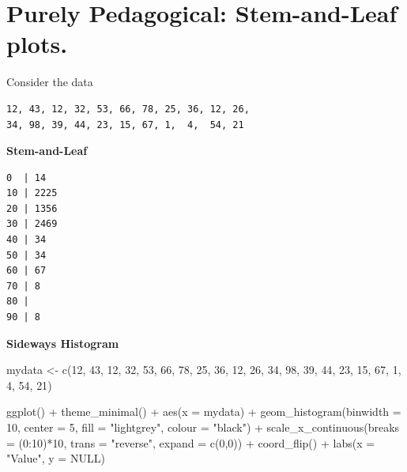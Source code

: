 \documentclass[
  letterpaper,
  DIV=11,
  numbers=noendperiod]{scrreprt}
\newenvironment{Shaded}{\begin{snugshade}}{\end{snugshade}}
\newcommand{\AttributeTok}[1]{\textcolor[rgb]{0.40,0.45,0.13}{#1}}
\newcommand{\ConstantTok}[1]{\textcolor[rgb]{0.56,0.35,0.01}{#1}}
\newcommand{\DecValTok}[1]{\textcolor[rgb]{0.68,0.00,0.00}{#1}}
\newcommand{\FunctionTok}[1]{\textcolor[rgb]{0.28,0.35,0.67}{#1}}
\newcommand{\NormalTok}[1]{\textcolor[rgb]{0.00,0.23,0.31}{#1}}
\newcommand{\OtherTok}[1]{\textcolor[rgb]{0.00,0.23,0.31}{#1}}
\newcommand{\SpecialCharTok}[1]{\textcolor[rgb]{0.37,0.37,0.37}{#1}}
\newcommand{\StringTok}[1]{\textcolor[rgb]{0.13,0.47,0.30}{#1}}
\begin{document}
\hypertarget{purely-pedagogical-stem-and-leaf-plots.}{%
\section{Purely Pedagogical: Stem-and-Leaf
plots.}\label{purely-pedagogical-stem-and-leaf-plots.}}

Consider the data

\begin{verbatim}
12, 43, 12, 32, 53, 66, 78, 25, 36, 12, 26,
34, 98, 39, 44, 23, 15, 67, 1,  4,  54, 21
\end{verbatim}

\textbf{Stem-and-Leaf}

\begin{verbatim}
0  | 14
10 | 2225
20 | 1356
30 | 2469
40 | 34
50 | 34
60 | 67
70 | 8
80 |
90 | 8
\end{verbatim}

\textbf{Sideways Histogram}

\begin{Shaded}
\begin{Highlighting}[]
\NormalTok{mydata }\OtherTok{\textless{}{-}} \FunctionTok{c}\NormalTok{(}\DecValTok{12}\NormalTok{, }\DecValTok{43}\NormalTok{, }\DecValTok{12}\NormalTok{, }\DecValTok{32}\NormalTok{, }\DecValTok{53}\NormalTok{, }\DecValTok{66}\NormalTok{, }\DecValTok{78}\NormalTok{, }\DecValTok{25}\NormalTok{, }\DecValTok{36}\NormalTok{, }\DecValTok{12}\NormalTok{, }\DecValTok{26}\NormalTok{,}
    \DecValTok{34}\NormalTok{, }\DecValTok{98}\NormalTok{, }\DecValTok{39}\NormalTok{, }\DecValTok{44}\NormalTok{, }\DecValTok{23}\NormalTok{, }\DecValTok{15}\NormalTok{, }\DecValTok{67}\NormalTok{, }\DecValTok{1}\NormalTok{,  }\DecValTok{4}\NormalTok{,  }\DecValTok{54}\NormalTok{, }\DecValTok{21}\NormalTok{)}

\FunctionTok{ggplot}\NormalTok{() }\SpecialCharTok{+} \FunctionTok{theme\_minimal}\NormalTok{() }\SpecialCharTok{+}
    \FunctionTok{aes}\NormalTok{(}\AttributeTok{x =}\NormalTok{ mydata) }\SpecialCharTok{+}
    \FunctionTok{geom\_histogram}\NormalTok{(}\AttributeTok{binwidth =} \DecValTok{10}\NormalTok{, }\AttributeTok{center =} \DecValTok{5}\NormalTok{,}
        \AttributeTok{fill =} \StringTok{"lightgrey"}\NormalTok{, }\AttributeTok{colour =} \StringTok{"black"}\NormalTok{) }\SpecialCharTok{+}
    \FunctionTok{scale\_x\_continuous}\NormalTok{(}\AttributeTok{breaks =}\NormalTok{ (}\DecValTok{0}\SpecialCharTok{:}\DecValTok{10}\NormalTok{)}\SpecialCharTok{*}\DecValTok{10}\NormalTok{, }\AttributeTok{trans =} \StringTok{"reverse"}\NormalTok{, }\AttributeTok{expand =} \FunctionTok{c}\NormalTok{(}\DecValTok{0}\NormalTok{,}\DecValTok{0}\NormalTok{)) }\SpecialCharTok{+}
    \FunctionTok{coord\_flip}\NormalTok{() }\SpecialCharTok{+} 
    \FunctionTok{labs}\NormalTok{(}\AttributeTok{x =} \StringTok{"Value"}\NormalTok{, }\AttributeTok{y =} \ConstantTok{NULL}\NormalTok{)}
\end{Highlighting}
\end{Shaded}
\end{document}
